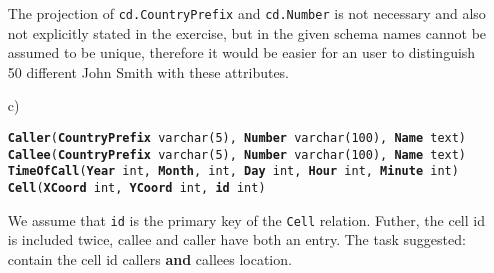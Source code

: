 \documentclass{scrartcl}
\begin{document}
\begin{itemize}
The projection of \texttt{cd.CountryPrefix} and \texttt{cd.Number} is not necessary and also not explicitly stated in the exercise, but in the given schema names cannot be assumed to be unique, therefore it would be easier for an user to distinguish 50 different John Smith with these attributes.

\item[c)]

\texttt{\textbf{Caller}(\textbf{CountryPrefix} varchar(5), \textbf{Number} varchar(100), \textbf{Name} text) \\
\textbf{Callee}(\textbf{CountryPrefix} varchar(5), \textbf{Number} varchar(100), \textbf{Name} text) \\
\textbf{TimeOfCall}(\textbf{Year} int, \textbf{Month}, int, \textbf{Day} int, \textbf{Hour} int, \textbf{Minute} int) \\
\textbf{Cell}(\textbf{XCoord} int, \textbf{YCoord} int, \textbf{id} int)}

We assume that \texttt{id} is the primary key of the \texttt{Cell} relation. Futher, the cell id is included twice, callee and caller have both an entry. The task suggested: contain the cell id callers \textbf{and} callees location.


\end{itemize}
\end{document}
